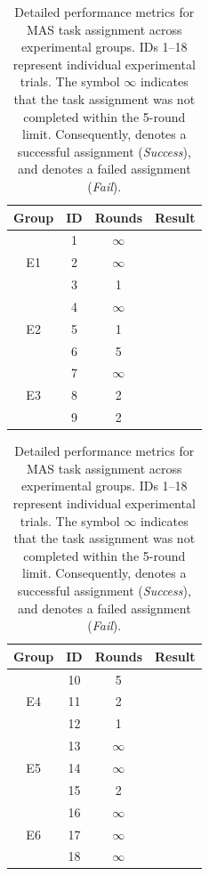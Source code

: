 \documentclass[11pt, letterpaper, shortlabels]{berkeley}
\newcommand{\cmark}{\textcolor{green!60!black}{\ding{51}}} %
\newcommand{\xmark}{\textcolor{red!70!black}{\ding{55}}}   %
\begin{document}
\begin{table}[t]
\centering
\caption{Detailed performance metrics for MAS task assignment across experimental groups. IDs 1--18 represent individual experimental trials. The symbol $\infty$ indicates that the task assignment was not completed within the 5-round limit. Consequently, \cmark denotes a successful assignment (\textit{Success}), and \xmark denotes a failed assignment (\textit{Fail}).}
\label{tab:mas_rounds_detailed}
\begin{minipage}[t]{0.48\linewidth}
\centering
\begin{tabular}{cccc}
\toprule
Group & ID & Rounds & Result \\
\midrule
\multirow{3}{*}{E1}
 & 1 & $\infty$ & \xmark \\
 & 2 & $\infty$ & \xmark \\
 & 3 & 1        & \cmark \\
\midrule
\multirow{3}{*}{E2}
 & 4 & $\infty$ & \xmark \\
 & 5 & 1        & \cmark \\
 & 6 & 5        & \cmark \\
\midrule
\multirow{3}{*}{E3}
 & 7 & $\infty$ & \xmark \\
 & 8 & 2        & \cmark \\
 & 9 & 2        & \cmark \\
\bottomrule
\end{tabular}
\end{minipage}
\hfill
\begin{minipage}[t]{0.48\linewidth}
\centering
\begin{tabular}{cccc}
\toprule
Group & ID & Rounds & Result \\
\midrule
\multirow{3}{*}{E4}
 & 10 & 5        & \cmark \\
 & 11 & 2        & \cmark \\
 & 12 & 1        & \cmark \\
\midrule
\multirow{3}{*}{E5}
 & 13 & $\infty$ & \xmark \\
 & 14 & $\infty$ & \xmark \\
 & 15 & 2        & \cmark \\
\midrule
\multirow{3}{*}{E6}
 & 16 & $\infty$ & \xmark \\
 & 17 & $\infty$ & \xmark \\
 & 18 & $\infty$ & \xmark \\
\bottomrule
\end{tabular}
\end{minipage}
\end{table}
\end{document}
